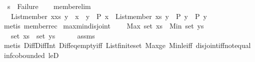 \begin{isabellebody}
\ \ {\isachardoublequoteopen}s{\isacharprime}{\kern0pt}\ {\isasymnoteq}\ Failure{\isachardoublequoteclose}\isanewline
%
\isadelimproof
\ \ %
\endisadelimproof
%
\isatagproof
{}\isamarkupfalse%
%
\endisatagproof
{\isafoldproof}%
%
\isadelimproof
\isanewline
%
\endisadelimproof
\isanewline
{}\isamarkupfalse%
\isanewline
\isanewline
\isanewline
{}\isamarkupfalse%
\ member{\isacharunderscore}{\kern0pt}elim{\isacharcolon}{\kern0pt}\ \isanewline
\ \ \ {\isachardoublequoteopen}List{\isachardot}{\kern0pt}member\ {\isacharparenleft}{\kern0pt}x{\isacharhash}{\kern0pt}xs{\isacharparenright}{\kern0pt}\ y\ {\isasymLongrightarrow}\ {\isacharparenleft}{\kern0pt}x\ {\isacharequal}{\kern0pt}\ y\ {\isasymLongrightarrow}\ P\ x{\isacharparenright}{\kern0pt}\ {\isasymLongrightarrow}\ {\isacharparenleft}{\kern0pt}List{\isachardot}{\kern0pt}member\ xs\ y\ {\isasymLongrightarrow}\ P\ y{\isacharparenright}{\kern0pt}\ {\isasymLongrightarrow}\ P\ y{\isachardoublequoteclose}\isanewline
%
\isadelimproof
\ \ %
\endisadelimproof
%
\isatagproof
{}\isamarkupfalse%
\ {\isacharparenleft}{\kern0pt}metis\ member{\isacharunderscore}{\kern0pt}rec{\isacharparenleft}{\kern0pt}{}{\isacharparenright}{\kern0pt}{\isacharparenright}{\kern0pt}%
\endisatagproof
{\isafoldproof}%
%
\isadelimproof
\isanewline
%
\endisadelimproof
\isanewline
{}\isamarkupfalse%
\ max{\isacharunderscore}{\kern0pt}min{\isacharunderscore}{\kern0pt}disjoint{\isacharcolon}{\kern0pt}\ \isanewline
\ \ \ {\isachardoublequoteopen}Max\ {\isacharparenleft}{\kern0pt}set\ xs{\isacharparenright}{\kern0pt}\ {\isacharless}{\kern0pt}\ Min\ {\isacharparenleft}{\kern0pt}set\ ys{\isacharparenright}{\kern0pt}{\isachardoublequoteclose}\isanewline
\ \ \ {\isachardoublequoteopen}set\ xs\ {\isasyminter}\ set\ ys\ {\isacharequal}{\kern0pt}\ {\isacharbraceleft}{\kern0pt}{\isacharbraceright}{\kern0pt}{\isachardoublequoteclose}\isanewline
%
\isadelimproof
\ \ %
\endisadelimproof
%
\isatagproof
{}\isamarkupfalse%
\ assms\isanewline
\ \ \isamarkupfalse%
\ {\isacharparenleft}{\kern0pt}metis\ Diff{\isacharunderscore}{\kern0pt}Diff{\isacharunderscore}{\kern0pt}Int\ Diff{\isacharunderscore}{\kern0pt}eq{\isacharunderscore}{\kern0pt}empty{\isacharunderscore}{\kern0pt}iff\ List{\isachardot}{\kern0pt}finite{\isacharunderscore}{\kern0pt}set\ Max{\isacharunderscore}{\kern0pt}ge\ Min{\isacharunderscore}{\kern0pt}le{\isacharunderscore}{\kern0pt}iff\ disjoint{\isacharunderscore}{\kern0pt}iff{\isacharunderscore}{\kern0pt}not{\isacharunderscore}{\kern0pt}equal\ inf{\isachardot}{\kern0pt}cobounded{}\ leD{\isacharparenright}{\kern0pt}%

\end{isabellebody}
